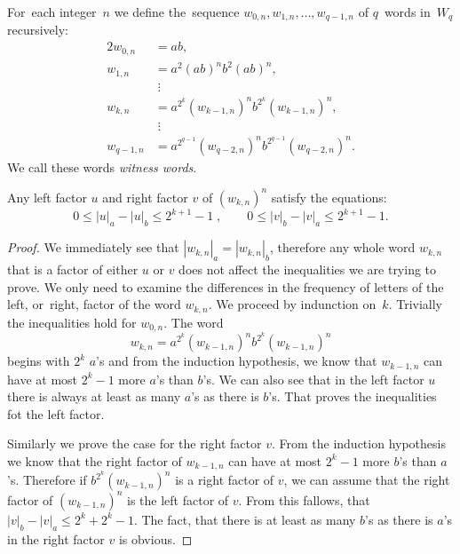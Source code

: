 \begin{defn}
    For~each integer~$n$ we define the~sequence $w_{0,n}, w_{1,n}, \dotsc , w_{q-1,n}$ of $q$~words in~$W_q$ recursively:
    \begin{alignat*}{2}
        w_{0,n} &= ab,\\
        w_{1,n} &= a^2{(ab)}^{n}b^2{(ab)}^{n},\\
                &\; \vdots \\
        w_{k,n} &= a^{2^k}{(w_{k-1,n})}^{n}b^{2^k}{(w_{k-1,n})}^{n},\\
                &\; \vdots \\
        w_{q-1,n} &= a^{2^{q-1}}{(w_{q-2,n})}^{n}b^{2^{q-1}}{(w_{q-2,n})}^{n}.
    \end{alignat*}
    We call these words \emph{witness words}.
\end{defn}

\begin{lemma}\label{lm:witness_words_inequalities}
    Any left factor $u$ and right factor $v$ of ${(w_{k,n})}^n$ satisfy the equations:
    \begin{equation}
        0 \leq |u|_a - |u|_b \leq 2^{k+1}-1 \; , \qquad 0 \leq |v|_b - |v|_a \leq 2^{k+1}-1.
    \end{equation}
\end{lemma}

\begin{proof}
    We immediately see that $|w_{k,n}|_a = |w_{k,n}|_b$, therefore any whole word $w_{k,n}$ that is a factor of either $u$ or $v$ does not affect the inequalities we are trying to prove. We only need to examine the differences in the frequency of letters of the left, or~right, factor of the word $w_{k,n}$. We proceed by indunction on~$k$. Trivially the inequalities hold for $w_{0,n}$. The word
    \[
        w_{k,n} = a^{2^k}{(w_{k-1,n})}^{n}b^{2^k}{(w_{k-1,n})}^{n}
    \] begins with $2^k$ $a$'s and from the induction hypothesis, we know that $w_{k-1,n}$ can have at most $2^k-1$ more $a$'s than $b$'s. We can also see that in the left factor $u$ there is always at least as many $a$'s as there is $b$'s. That proves the inequalities fot the left factor.

    Similarly we prove the case for the right factor $v$. From the induction hypothesis we know that the right factor of $w_{k-1,n}$ can have at most $2^k-1$ more $b$'s than $a$'s. Therefore if $b^{2^k}{(w_{k-1,n})}^{n}$ is a right factor of $v$, we can assume that the right factor of ${(w_{k-1,n})}^{n}$ is the left factor of $v$. From this fallows, that $|v|_b - |v|_a \leq 2^k + 2^k -1$. The fact, that there is at least as many $b$'s as there is $a$'s in the right factor $v$ is obvious.
\end{proof}

